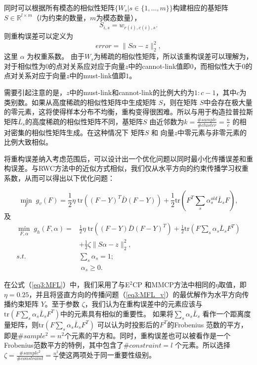 同时可以根据所有模态的相似性矩阵$ \{{W}_s|s\in\{1,\dots,m\}\} $构建相应的基矩阵$ {S} \in \mathbb{R}^{l\times m}$（$l$为约束的数量，$m$为模态数量），
\begin{equation}
 {S}_{i,s} = w_{r(i), c(i), s}.
\end{equation}
则重构误差可以定义为
\begin{equation}
error = \|{S}{\alpha}-{z}\|_2^2,
\end{equation}
这里 $ {\alpha} $ 为权重系数。
由于${W}_s$为稀疏的相似性矩阵，所以该重构误差可以理解为，对于相似性为$0$的点对关系应对应于向量$z$中的cannot-link值即$0$，而相似性大于$0$的点对关系对应于向量$z$中的must-link值即$1$。

需要引起注意的是，$z$中的must-link和cannot-link的比例大约为$1:c-1 $，其中$c$为类别数。如果从高度稀疏的相似性矩阵中生成矩阵 $S$，则在矩阵 $S$中会存在极大量的零元素，这将使得样本分布不均衡，重构变得很困难。所以与用于构造拉普拉斯矩阵$ \bar{{L}}_s $的高度稀疏的相似性矩阵不同，基矩阵$S$ 由近邻数为$ k=\frac{\#sample}{\#cluster} = \frac{n}{c}$ 的相对密集的相似性矩阵生成。在这种情况下 矩阵$S$ 和 向量$z$中零元素与非零元素的比例大致相似。

将重构误差纳入考虑范围后，可以设计出一个优化问题以同时最小化传播误差和重构误差。与RWC方法中的近似方式相似，我们仅从水平方向的约束传播学习权重系数，从而可以得出以下优化问题：

\begin{equation}
\mathop{\mathrm{min}}_{{F}}\;g_v({F})=\frac{1}{2}\eta \;\mathrm{tr}(({F}-{Y})^T\bar{{D}}({F}-{Y}))+\frac{1}{2}\mathrm{tr}({F}^T \sum_s\alpha_s^{old}\bar{{L}}_s{F}),
\label{eq3:MFL_v}
\end{equation}
及
\begin{equation}
\begin{split}
\mathop{\mathrm{min}}_{{F},{\alpha}}\;g_h({F}, {\alpha})=&\frac{1}{2}\eta\;\mathrm{tr}(({F}-{Y})\bar{{D}}({F}-{Y})^T)+\frac{1}{2}\mathrm{tr}({F} \sum_s\alpha_s\bar{{L}}_s{F}^T) \\ &+\frac{1}{2}\zeta\|{S}{\alpha} - {z}\|_2^2,\\
s.t. \quad\;& \sum_s \alpha_s = 1;\\ &\; \alpha_s \ge 0.
\end{split}
\label{eq3:MFL}
\end{equation}

在公式（\ref{eq3:MFL}）中，我们采用了与E$^2$CP\cite{lu2010constrained} 和MMCP\cite{fu2011multi}方法中相同的$ \eta $取值，即$ \eta = 0.25 $，并且将竖直方向的传播问题（\ref{eq3:MFL_v}）的最优解作为水平方向传播约束矩阵 $ {Y} $。至于参数 $ \zeta $，我们认为在重构误差中的元素应该与$ \mathrm{tr}({F} \sum_s\alpha_s\bar{{L}}_s{F}^T) $中的元素具有相似的重要性。 如果将$ \sum_s\alpha_s\bar{{L}}_s $ 看作一个距离度量矩阵，则$ \mathrm{tr}({F} \sum_s\alpha_s\bar{{L}}_s{F}^T) $ 可以认为时投影后的$ {F}^T $的Frobenius 范数的平方，即是$\#sample^2=n^2$个元素的平方和。同时，重构误差也可以被看作是一个Frobenius范数平方的特例，其中包含了$ \#constraint = l $ 个元素。所以选择 $ \zeta = \frac{\#sample^2}{\#constraint}=\frac{n^2}{l} $使这两项处于同一重要性级别。

